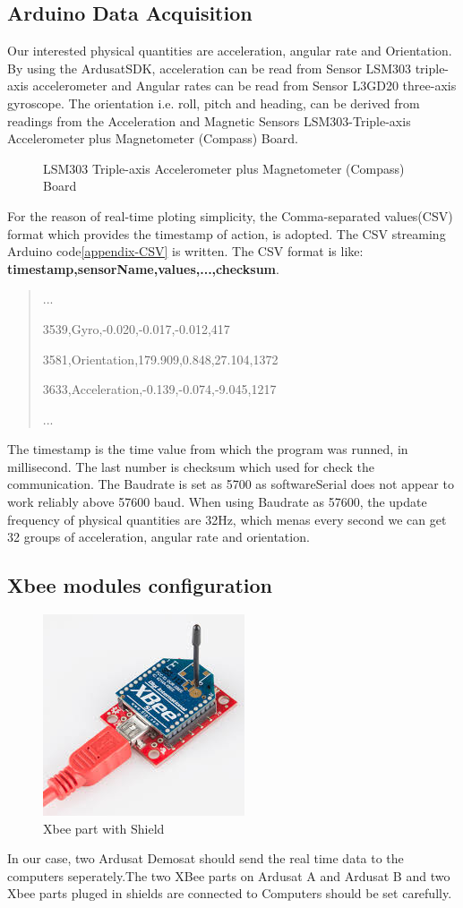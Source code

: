 \subsection{Arduino Data Acquisition}
Our interested physical quantities are acceleration, angular rate and Orientation. By using the ArdusatSDK\cite{https://github.com/ArduSat/ArdusatSDK}, acceleration can be read from Sensor LSM303 triple-axis accelerometer and Angular rates can be read from Sensor L3GD20 three-axis gyroscope. The orientation i.e. roll, pitch and heading, can be derived from readings from the Acceleration and Magnetic Sensors LSM303-Triple-axis Accelerometer plus Magnetometer (Compass) Board.
\begin{figure}
\caption{LSM303 Triple-axis Accelerometer plus Magnetometer (Compass) Board}
\end{figure}
For the reason of real-time ploting simplicity, the Comma-separated values(CSV) format which provides the timestamp of action, is adopted. The CSV streaming Arduino code\ref{appendix-CSV} is written. The CSV format is like: \textbf{timestamp,sensorName,values,...,checksum}.
\begin{quote}
\centering
...

3539,Gyro,-0.020,-0.017,-0.012,417

3581,Orientation,179.909,0.848,27.104,1372

3633,Acceleration,-0.139,-0.074,-9.045,1217

...
\end{quote}

The timestamp is the time value from which the program was runned, in millisecond. The last number is checksum which used for check the communication.
The Baudrate is set as 5700 as softwareSerial does not appear to work reliably above 57600 baud.\cite{https://github.com/ArduSat/ArdusatSDK}
When using Baudrate as 57600, the update frequency of physical quantities are 32Hz, which menas every second we can get 32 groups of acceleration, angular rate and orientation.

\subsection{Xbee modules configuration}
\begin{figure}
\centering
\includegraphics{fig/DOE/XbeeShield}
\caption{Xbee part with Shield}
\end{figure}
In our case, two Ardusat Demosat should send the real time data to the computers seperately.The two XBee parts on Ardusat A and Ardusat B and two Xbee parts pluged in shields are connected to Computers should be set carefully.

